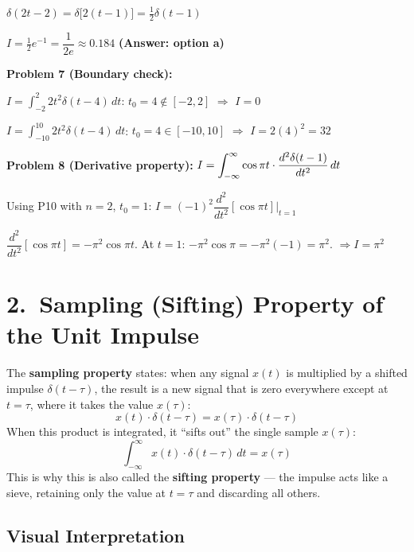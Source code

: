 \documentclass[10pt,a4paper]{article}
\newcommand{\Int}{\displaystyle\int_{-\infty}^{\infty}}
\begin{document}
\begin{exbox}
$\delta(2t-2)=\delta\bigl[2(t-1)\bigr]=\tfrac{1}{2}\delta(t-1)$

$I=\tfrac{1}{2}e^{-1}=\boxed{\dfrac{1}{2e}}\approx 0.184$ \quad\textbf{(Answer: option a)}

\medskip
\textbf{Problem 7 (Boundary check):}

$I=\displaystyle\int_{-2}^{2}2t^2\delta(t-4)\,dt$: $t_0=4\notin[-2,2]$ $\Rightarrow$ $I=\boxed{0}$

$I=\displaystyle\int_{-10}^{10}2t^2\delta(t-4)\,dt$: $t_0=4\in[-10,10]$ $\Rightarrow$ $I=2(4)^2=\boxed{32}$

\medskip
\textbf{Problem 8 (Derivative property):} $I=\displaystyle\Int\cos\pi t\cdot\frac{d^2\delta(t-1)}{dt^2}\,dt$

Using P10 with $n=2$, $t_0=1$: $I=(-1)^2\dfrac{d^2}{dt^2}[\cos\pi t]\Big|_{t=1}$

$\dfrac{d^2}{dt^2}[\cos\pi t]=-\pi^2\cos\pi t$. At $t=1$: $-\pi^2\cos\pi = -\pi^2(-1) = \pi^2$. $\Rightarrow I=\boxed{\pi^2}$
\end{exbox}

\section{2.\ Sampling (Sifting) Property of the Unit Impulse}

\begin{defbox}
The \textbf{sampling property} states: when any signal $x(t)$ is multiplied by a shifted impulse $\delta(t-\tau)$, the result is a new signal that is zero everywhere except at $t=\tau$, where it takes the value $x(\tau)$:
\[
  x(t)\cdot\delta(t-\tau) = x(\tau)\cdot\delta(t-\tau)
\]
When this product is integrated, it ``sifts out'' the single sample $x(\tau)$:
\[
  \Int x(t)\cdot\delta(t-\tau)\,dt = x(\tau)
\]
This is why this is also called the \textbf{sifting property} --- the impulse acts like a sieve, retaining only the value at $t=\tau$ and discarding all others.
\end{defbox}

\subsection*{Visual Interpretation}
\end{document}
